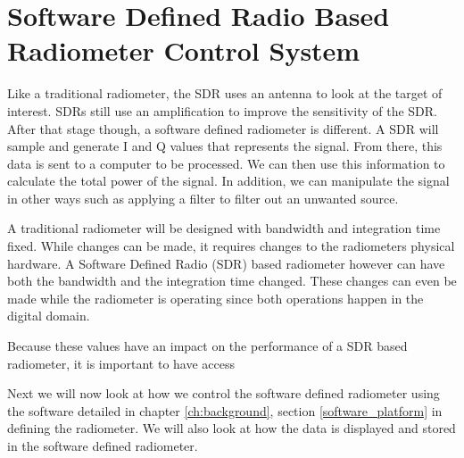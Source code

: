 \section{Software Defined Radio Based Radiometer Control System}

Like a traditional radiometer, the SDR uses an antenna to look at the target of interest.  SDRs still use an amplification to improve the sensitivity of the SDR. After that stage though, a software defined radiometer is different.  A SDR will sample and generate I and Q values that represents the signal.  From there, this data is sent to a computer to be processed.  We can then use this information to calculate the total power of the signal.  In addition, we can manipulate the signal in other ways such as applying a filter to filter out an unwanted source.

A traditional radiometer will be designed with bandwidth and integration time fixed.  While changes can be made, it requires changes to the radiometers physical hardware.  A Software Defined Radio (SDR) based radiometer however can have both the  bandwidth and the integration time changed.  These changes can even be made while the radiometer is operating since both operations happen in the digital domain.  

Because these values have an impact on the performance of a SDR based radiometer, it is important to have access 




Next we will now look at how we control the software defined radiometer using the software detailed in chapter \ref{ch:background}, section \ref{software_platform} in defining the radiometer.  We will also look at how the data is displayed and stored in the software defined radiometer.


